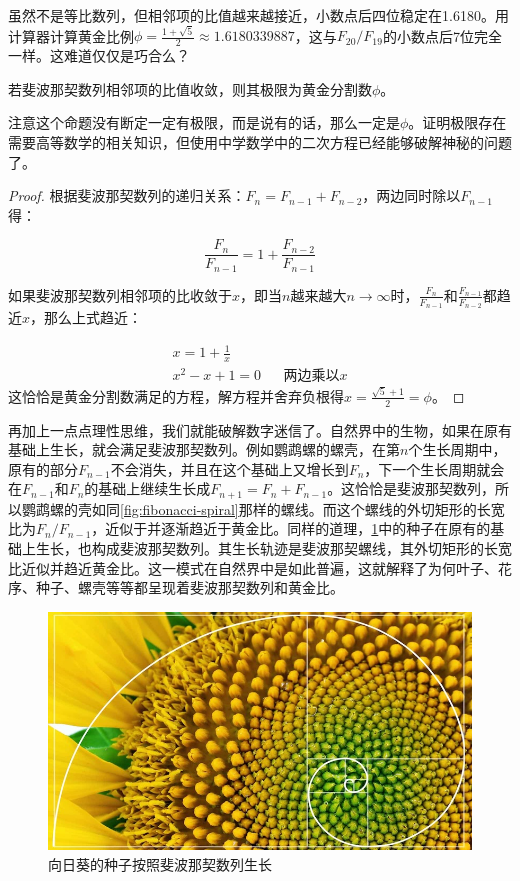 \documentclass[b5paper]{ctexart}
\begin{document}
虽然不是等比数列，但相邻项的比值越来越接近，小数点后四位稳定在1.6180。用计算器计算黄金比例$\phi = \frac{1+\sqrt{5}}{2} \approx 1.6180339887$，这与$F_{20}/F_{19}$的小数点后7位完全一样。这难道仅仅是巧合么？

\begin{proposition}
若斐波那契数列相邻项的比值收敛，则其极限为黄金分割数$\phi$。
\end{proposition}

注意这个命题没有断定一定有极限，而是说有的话，那么一定是$\phi$。证明极限存在需要高等数学的相关知识，但使用中学数学中的二次方程已经能够破解神秘的问题了。

\begin{proof}
根据斐波那契数列的递归关系：$F_n = F_{n-1} + F_{n-2}$，两边同时除以$F_{n-1}$得：

\[
\frac{F_n}{F_{n-1}} = 1 + \frac{F_{n-2}}{F_{n-1}}
\]

如果斐波那契数列相邻项的比收敛于$x$，即当$n$越来越大$n \to \infty$时，$\frac{F_n}{F_{n-1}}$和$\frac{F_{n-1}}{F_{n-2}}$都趋近$x$，那么上式趋近：

\begin{align*}
x = 1 + \frac{1}{x}  \\
x^2 - x + 1 = 0 && \text{两边乘以}x
\end{align*}
这恰恰是黄金分割数满足的方程，解方程并舍弃负根得$x = \frac{\sqrt{5} + 1}{2} = \phi$。
\end{proof}

再加上一点点理性思维，我们就能破解数字迷信了。自然界中的生物，如果在原有基础上生长，就会满足斐波那契数列。例如鹦鹉螺的螺壳，在第$n$个生长周期中，原有的部分$F_{n-1}$不会消失，并且在这个基础上又增长到$F_n$，下一个生长周期就会在$F_{n-1}$和$F_{n}$的基础上继续生长成$F_{n+1} = F_{n} + F_{n-1}$。这恰恰是斐波那契数列，所以鹦鹉螺的壳如同\cref{fig:fibonacci-spiral}那样的螺线。而这个螺线的外切矩形的长宽比为$F_{n}/F_{n-1}$，近似于并逐渐趋近于黄金比。同样的道理，\cref{fig:sunflower}中的种子在原有的基础上生长，也构成斐波那契数列。其生长轨迹是斐波那契螺线，其外切矩形的长宽比近似并趋近黄金比。这一模式在自然界中是如此普遍，这就解释了为何叶子、花序、种子、螺壳等等都呈现着斐波那契数列和黄金比。

\begin{figure}[htbp]
 \centering
 \includegraphics[scale=0.3]{img/sunflower}
 \caption{向日葵的种子按照斐波那契数列生长}
 \label{fig:sunflower}
\end{figure}
\end{document}
